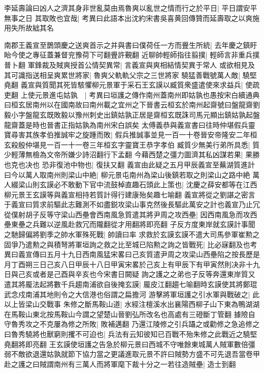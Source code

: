 李延壽論曰凶人之濟其身非世亂莫由焉魯爽以亂世之情而行之於平日|{
	平日謂安平無事之日}
其取敗也宜哉|{
	考異曰此語本出沈約宋書吳喜黄回傳贊而延壽取之以爽施用失所故絀其名}


南郡王義宣至鵲頭慶之送爽首示之并與書曰僕荷任一方而舋生所統|{
	去年慶之鎮盱眙今使之專征蓋兼督兖豫荷下可翻舋許覲翻}
近聊帥輕師指往翦撲|{
	輕師言非重兵撲普卜翻}
軍鋒裁及賊爽授首公情契異常|{
	言義宣與爽相結情契異于常人}
或欲相見及其可識指送相呈爽累世將家|{
	魯爽父軌軌父宗之三世將家}
驍猛善戰號萬人敵|{
	驍堅堯翻}
義宣與質聞其死皆駭懼柳元景軍于采石王玄謨以臧質衆盛遣使來求益兵|{
	使疏吏翻}
上使元景進屯姑孰　|{
	考異曰垣護之傳作南州蓋南州即姑孰也愚按宋白續通典曰桓玄居南州以在國南故曰南州載之宜州之下晉書云桓玄於南州起齋號曰盤龍齋劉毅小字盤龍玄既敗毅以豫州刺史出鎮姑孰正居是齋桓玄既誅司馬元顯出鎮姑孰起盤龍齋蓋是時也晉書正指姑孰為南州宋白誤矣}
太傅義恭與義宣書曰往時仲堪假兵靈寶尋害其族孝伯推誠牢之旋踵而敗|{
	假兵推誠事並見一百一十卷晉安帝隆安二年桓玄殺殷仲堪見一百一十一卷三年桓玄字靈寶王恭字孝伯}
臧質少無美行弟所具悉|{
	質少輕薄無檢為文帝所嫌少詩沼翻行下孟翻}
今藉西楚之彊力圖濟其私凶謀若果|{
	果勝也克也决也}
恐非復池中物也|{
	復扶又翻}
義宣由此疑之五月甲辰義宣至蕪湖質進計曰今以萬人取南州則梁山中絶|{
	柳元景屯南州為梁山後鎮若取之則梁山之路中絶}
萬人綴梁山則玄謨必不敢動下官中流鼓棹直趣石頭此上策也|{
	沈慶之薛安都等在江西柳元景王玄謨等與義宣相持若質計得行建康殆矣趣七喻翻}
義宣將從之劉諶之密言于義宣曰質求前驅此志難測不如盡鋭攻梁山事克然後長驅此萬安之計也義宣乃止冗從僕射胡子反等守梁山西壘會西南風急質遣其將尹周之攻西壘|{
	因西南風急而攻西壘東壘之兵難以逆風赴救冗而隴翻從才用翻將即亮翻}
子反方度東岸就玄謨計事聞之馳歸偏將劉季之帥水軍殊死戰|{
	帥讀曰率}
求救於玄謨玄謨不遣大司馬參軍崔勲之固爭乃遣勲之與積弩將軍垣詢之救之比至城已陷勲之詢之皆戰死|{
	比必寐翻及也考異曰義宣傳曰五月十九日西南風猛宋畧曰己亥質遣尹周之攻梁山西壘陷之按長歷是月丁酉朔三日己亥八日甲辰十八日甲寅宋畧於己亥上有甲辰下有甲寅然則决非十九日與己亥或者是己酉與辛亥也今宋書日闕疑}
詢之護之之弟也子反等奔還東岸質又遣其將龎法起將數千兵趨南浦欲自後掩玄謨|{
	龎皮江翻趨七喻翻時玄謨使其將鄭琨武念戍南浦其地則令之大信港也俗謂之扁擔河}
游擊將軍垣護之引水軍與戰破之|{
	此以上皆梁山交戰事}
朱修之斷馬鞍山道|{
	水經注檀溪水出襄陽西柳子山下東為鴨湖湖在馬鞍山東北按馬鞍山今謂之望楚山晉劉弘所改名也高處有三磴斷丁管翻}
據險自守魯秀攻之不克屢為修之所敗|{
	敗補邁翻}
乃還江陵修之引兵躡之或勸修之急追修之曰魯秀驍將也獸窮則攫不可迫也|{
	兵法有云知彼知已百戰不殆朱修之此戰近之驍堅堯翻將即亮翻}
王玄謨使垣護之告急於柳元景曰西城不守唯餘東城萬人賊軍數倍彊弱不敵欲退還姑孰就節下協力當之更議進取元景不許曰賊勢方盛不可先退吾當卷甲赴之護之曰賊謂南州有三萬人而將軍麾下裁十分之一若往造賊壘|{
	造士到翻}
